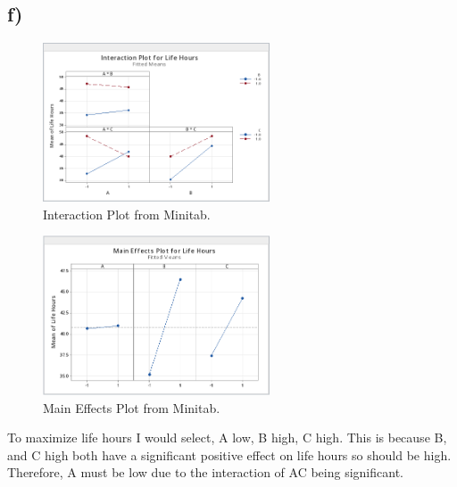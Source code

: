 \documentclass{article}
\begin{document}
\subsection*{f)}
\begin{figure}[h]
    \centering
    \includegraphics[width=0.6\textwidth]{./images/1_e_2.png}
    \caption{Interaction Plot from Minitab.}
    \label{fig:3_b_2}
\end{figure}
\begin{figure}[h]
    \centering
    \includegraphics[width=0.6\textwidth]{./images/1_e_1.png}
    \caption{Main Effects Plot from Minitab.}
    \label{fig:3_b_2}
\end{figure}
To maximize life hours I would select, A low, B high, C high.
This is because B, and C high both have a significant positive effect on life hours so should be high.
Therefore, A must be low due to the interaction of AC being significant.

\clearpage
\end{document}
